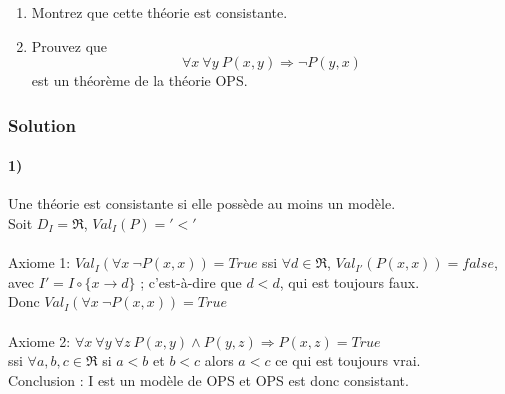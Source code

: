 \begin{enumerate}
\item Montrez que cette th\'{e}orie est consistante.
\item Prouvez que
$$
\forall x \ \forall y \ P(x, y) \Rightarrow \neg P(y, x)
$$
est un th\'{e}or\`{e}me de la th\'{e}orie OPS.
\end{enumerate}

    \subsubsection*{Solution}
    \paragraph{1)}
    Une théorie est consistante si elle possède au moins un modèle.\\
    Soit $D_I = \Re$, $Val_I(P) = '<'$\\
    \\
    Axiome 1: $Val_I (\forall x \ \neg P(x,x)) = True$ ssi $\forall d \in \Re$, $Val_{I'} ( P(x,x)) = false$, avec $I' = I \circ \{x \rightarrow d\}$ ; c'est-à-dire que $d<d$, qui est toujours faux.\\
    Donc $Val_I (\forall x \ \neg P(x,x)) = True$\\
    \\
    Axiome 2: $\forall x \ \forall y \ \forall z \ P(x, y) \wedge P(y, z) \Rightarrow P(x, z)= True$ \\
    ssi $\forall a,b,c \in \Re $  si $a <b$ et $b<c$ alors $a<c$ ce qui est toujours vrai.\\
    Conclusion : I est un modèle de OPS et OPS est donc consistant.
    
    
